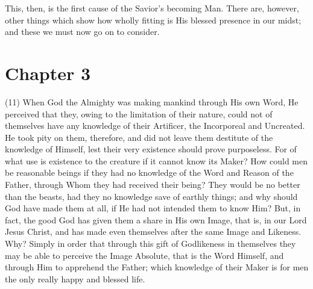 \documentclass[9pt, twocolumn, oneside, a4paper]{memoir}
\begin{document}
This, then, is the first cause of the Savior's becoming Man. There are,       however, other things which show how wholly fitting is His blessed presence in       our midst; and these we must now go on to consider.   

\section*{Chapter 3}



\textsc{(11)} When God the Almighty was making mankind through       His own Word, He perceived that they, owing to the limitation of their nature,       could not of themselves have any knowledge of their Artificer, the Incorporeal       and Uncreated. He took pity on them, therefore, and did not leave them destitute       of the knowledge of Himself, lest their very existence should prove purposeless.       For of what use is existence to the creature if it cannot know its Maker? How       could men be reasonable beings if they had no knowledge of the Word and Reason       of the Father, through Whom they had received their being? They would be no       better than the beasts, had they no knowledge save of earthly things; and why       should God have made them at all, if He had not intended them to know Him? But,       in fact, the good God has given them a share in His own Image, that is, in our       Lord Jesus Christ, and has made even themselves after the same Image and       Likeness. Why? Simply in order that through this gift of Godlikeness in       themselves they may be able to perceive the Image Absolute, that is the Word       Himself, and through Him to apprehend the Father; which knowledge of their Maker       is for men the only really happy and blessed life.   
\end{document}
